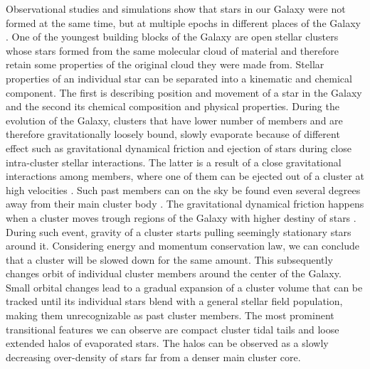 Observational studies and simulations show that stars in our Galaxy were not formed at the same time, but at multiple epochs in different places of the Galaxy \cite{2001ApJ...554.1044C, 2017ARA&A..55...59N}. One of the youngest building blocks of the Galaxy are open stellar clusters whose stars formed from the same molecular cloud of material \cite{2003ARA&A..41...57L} and therefore retain some properties of the original cloud they were made from. Stellar properties of an individual star can be separated into a kinematic and chemical component. The first is describing position and movement of a star in the Galaxy and the second its chemical composition and physical properties. During the evolution of the Galaxy, clusters that have lower number of members and are therefore gravitationally loosely bound, slowly evaporate because of different effect such as gravitational dynamical friction and ejection of stars during close intra-cluster stellar interactions. The latter is a result of a close gravitational interactions among members, where one of them can be ejected out of a cluster at high velocities \cite{2009MNRAS.396..570G, 2010MNRAS.402..105G, 2017MNRAS.470.3049R}. Such past members can on the sky be found even several degrees away from their main cluster body \cite{2007MNRAS.376L..29G, 2018MNRAS.473.4612K, 2019ApJ...884....6M}. The gravitational dynamical friction happens when a cluster moves trough regions of the Galaxy with higher destiny of stars \cite{2010MNRAS.401.2753B}. During such event, gravity of a cluster starts pulling seemingly stationary stars around it. Considering energy and momentum conservation law, we can conclude that a cluster will be slowed down for the same amount. This subsequently changes orbit of individual cluster members around the center of the Galaxy. Small orbital changes lead to a gradual expansion of a cluster volume that can be tracked until its individual stars blend with a general stellar field population, making them unrecognizable as past cluster members. The most prominent transitional features we can observe are compact cluster tidal tails \cite{2019AA...627A...4R, 2019AJ....157..115Y, 2019AA...621L...3M, 2019arXiv191206657Z} and loose extended halos of evaporated stars. The halos can be observed as a slowly decreasing over-density \cite{2002A&A...385..471C, 2004A&A...427..485B, 2019AA...627A.119C} of stars far from a denser main cluster core.

